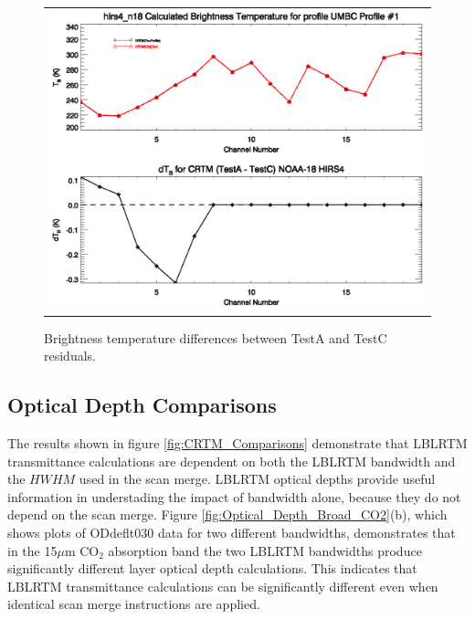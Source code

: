 \begin{figure}[htp]
  \centering{}
  \begin{tabular}{c}
    \includegraphics[bb=80 228 572 395, clip, scale=0.8]{./graphics/TestA_Versus_TestC.eps}
  \end{tabular}
  \caption{Brightness temperature differences between TestA and TestC residuals.}
  \label{fig:TestA_TestC}
\end{figure}


\subsection{Optical Depth Comparisons}

The results shown in figure \ref{fig:CRTM_Comparisons} demonstrate that LBLRTM transmittance calculations are dependent on both the LBLRTM bandwidth and the $HWHM$ used in the scan merge.  LBLRTM optical depths provide useful information in understading the impact of bandwidth alone, because they do not depend on the scan merge. Figure \ref{fig:Optical_Depth_Broad_CO2}(b), which shows plots of ODdeflt\textunderscore{}030 data for two different bandwidths, demonstrates that in the 15$\mu$m CO$_2$ absorption band the two LBLRTM bandwidths produce significantly different layer optical depth calculations. This indicates that LBLRTM transmittance calculations can be significantly different even when identical scan merge instructions are applied. 

